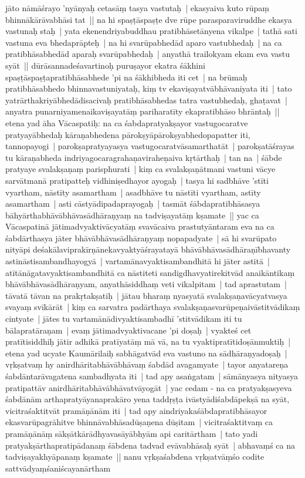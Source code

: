 \documentclass[article,12pt,a4paper]{memoir}%
\begin{document}
	  
	  \pstart \leavevmode%
	jāto nāmāśrayo 'nyānyaḥ cetasāṃ tasya vastutaḥ | ekasyaiva kuto rūpaṃ bhinnākārāvabhāsi tat ||  \label{thakur75-60.29} na hi spaṣṭāspaṣṭe dve rūpe parasparaviruddhe ekasya vastunaḥ staḥ | yata ekenendriyabuddhau pratibhāsetānyena vikalpe | tathā sati vastuna eva bhedaprāpteḥ | na hi svarūpabhedād aparo vastubhedaḥ | na ca pratibhāsabhedād aparaḥ svarūpabhedaḥ | anyathā trailokyam ekam eva vastu syāt || \label{thakur75-61.3} dūrāsannadeśavartinoḥ puruṣayor ekatra śākhini spaṣṭāspaṣṭapratibhāsabhede 'pi na śākhibheda iti cet | na brūmaḥ pratibhāsabhedo bhinnavastuniyataḥ, kiṃ tv ekaviṣayatvābhāvaniyata iti | tato yatrārthakriyābhedādisacivaḥ pratibhāsabhedas tatra vastubhedaḥ, ghaṭavat | anyatra punarniyamenaikaviṣayatāṃ pariharatīty ekapratibhāso bhrāntaḥ || \label{thakur75-61.7} etena yad āha Vācaspatiḥ: na ca śabdapratyakṣayor vastugocaratve pratyayābhedaḥ kāraṇabhedena pārokṣyāpārokṣyabhedopapatter iti, tannopayogi | parokṣapratyayasya vastugocaratvāsamarthatāt | parokṣatāśrayas tu kāraṇabheda indriyagocaragrahaṇaviraheṇaiva kṛtārthaḥ | tan na | śābde pratyaye svalakṣaṇaṃ parisphurati | kiṃ ca svalakṣaṇātmani vastuni vācye sarvātmanā pratipatteḥ vidhiniṣedhayor ayogaḥ | tasya hi sadbhāve 'stīti vyartham, nāstīty asamartham | asadbhāve tu nāstīti vyartham, astīty asamartham | asti cāstyādipadaprayogaḥ | tasmāt śābdapratibhāsasya bāhyārthabhāvābhāvasādhāraṇyaṃ na tadviṣayatāṃ kṣamate || \label{thakur75-61.15} yac ca Vācaspatinā jātimadvyaktivācyatāṃ svavācaiva prastutyāntaram eva na ca śabdārthasya jāter bhāvābhāvasādhāraṇyaṃ nopapadyate | sā hi svarūpato nityāpi deśakālaviprakīrṇānekavyaktyāśrayatayā bhāvābhāvasādhāraṇībhavanty astināstisambandhayogyā | vartamānavyaktisambandhitā hi jāter astitā | atītānāgatavyaktisambandhitā ca nāstiteti sandigdhavyatirekitvād anaikāntikaṃ bhāvābhāvasādhāraṇyam, anyathāsiddhaṃ veti vikalpitam | tad aprastutam | tāvatā tāvan na prakṛtakṣatiḥ | jātau bharaṃ nyasyatā svalakṣaṇavācyatvasya svayaṃ svīkārāt | kiṃ ca sarvatra padārthaya svalakṣaṇasvarūpeṇaivāstitvādikaṃ cintyate | jātes tu vartamānādivyaktisambadhī 'stitvādikam iti tu bālapratāraṇam | evaṃ jātimadvyaktivacane 'pi doṣaḥ | vyakteś cet pratītisiddhiḥ jātir adhikā pratīyatāṃ mā vā, na tu vyaktipratītidoṣānmuktiḥ | \label{thakur75-61.25} etena yad ucyate Kaumārilaiḥ sabhāgatvād eva vastuno na sādhāraṇyadoṣaḥ | vṛkṣatvaṃ hy anirdhāritabhāvābhāvaṃ śabdād avagamyate | tayor anyatareṇa śabdāntarāvagatena sambadhyata iti | tad apy asaṅgatam | sāmānyasya nityasya pratipattāv anirdhāritabhāvābhāvatvāyogāt | \label{thakur75-62.1} yac cedam - na ca pratyakṣasyeva śabdānām arthapratyāyanaprakāro yena taddṛṣṭa ivāstyādiśabdāpekṣā na syāt, vicitraśaktitvāt pramāṇānām iti | tad apy aindriyakaśābdapratibhāsayor ekasvarūpagrāhitve bhinnāvabhāsadūṣaṇena dūṣitam | vicitraśaktitvaṃ ca pramāṇānāṃ sākṣātkārādhyavasāyābhyām api caritārtham | tato yadi pratyakṣārthapratipādanaṃ śābdena tadvad evāvabhāsaḥ syāt | abhavaṃś ca na tadviṣayakhyāpanaṃ kṣamate || \label{thakur75-62.6} nanu vṛkṣaśabdena vṛkṣatvāṃśo codite sattvādyaṃśaniścayanārtham 
\end{document}

